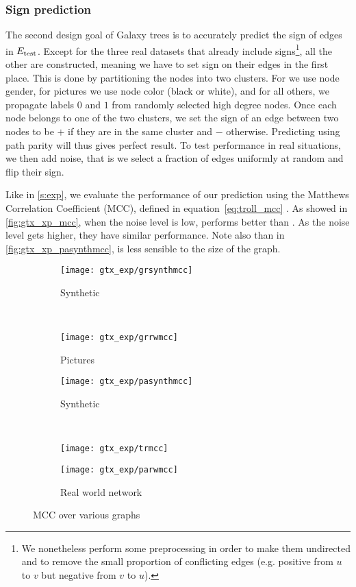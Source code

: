 \subsubsection{Sign prediction}

The second design goal of Galaxy trees is to accurately predict the sign of edges in $E_{\mathrm{test}}{}$.
Except for the three real datasets that already include signs\footnote{We nonetheless perform some
preprocessing in order to make them undirected and to remove the small proportion of conflicting edges
(e.g. positive from $u$ to $v$ but negative from $v$ to $u$).}, all the other are constructed,
meaning we have to set sign on their edges in the first place. This is done by partitioning the
nodes into two clusters. For \gplus{} we use node gender, for pictures we use node color (black or
white), and for all others, we propagate labels $0$ and $1$ from randomly selected high degree nodes.
Once each node belongs to one of the two clusters, we set the sign of an edge between two nodes to
be $+$ if they are in the same cluster and $-$ otherwise.  Predicting using path parity will thus
gives perfect result. To test performance in real situations, we then add noise, that
is we select a fraction of edges uniformly at random and flip their sign. 

Like in \autoref{s:exp}, we evaluate the performance of our prediction using the Matthews
Correlation Coefficient (MCC), defined in equation~\autoref{eq:troll_mcc} .
As showed in \autoref{fig:gtx_xp_mcc}, when the noise level is low, \gtx{} performs better than
\bfs{}. As the noise level gets higher, they have similar performance. Note also than in
\autoref{fig:gtx_xp_pasynthmcc}, \gtx{} is less sensible to the size of the graph.

\begin{figure}[tbh]
	\centering
	\begin{subfigure}[b]{0.47\textwidth}
		\texttt{[image: gtx\_exp/grsynthmcc]}
		\caption{Synthetic \grid{} }\label{fig:gtx_xp_grsynthmcc}
	\end{subfigure}~
	\begin{subfigure}[b]{0.47\textwidth}
		\texttt{[image: gtx\_exp/grrwmcc]}
		\caption{Pictures \grid{} }\label{fig:gtx_xp_grrwmcc}
	\end{subfigure}
	\begin{subfigure}[b]{0.47\textwidth}
		\texttt{[image: gtx\_exp/pasynthmcc]}
		\caption{Synthetic \lpa{} }\label{fig:gtx_xp_pasynthmcc}
	\end{subfigure}~
	\begin{subfigure}[b]{0.47\textwidth}
		\texttt{[image: gtx\_exp/trmcc]}
		\caption{\triangle{} }\label{fig:gtx_xp_trmcc}
	\end{subfigure}
	\begin{subfigure}[b]{0.47\textwidth}
		\texttt{[image: gtx\_exp/parwmcc]}
		\caption{Real world network }\label{fig:gtx_xp_parwmcc}
	\end{subfigure}
	\caption{MCC over various graphs}\label{fig:gtx_xp_mcc}
\end{figure}

